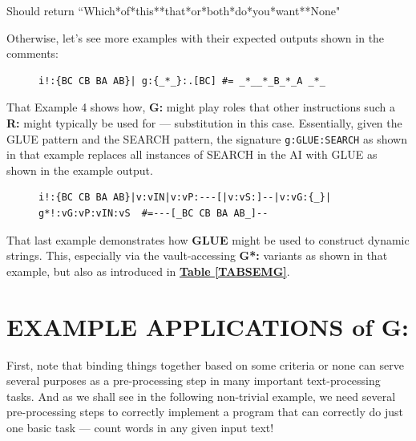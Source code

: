 \documentclass[a4paper, 18pt]{book} %
\begin{document}
Should return ``Which*of*this**that*or*both*do*you*want**None"


Otherwise, let's see more examples with their expected outputs shown in the comments:


\begin{figure}[H]
 \Large
  \centering
  \begin{tcolorbox}[teaterminalstyle, title=G: EXAMPLE 4]
  \begin{lstlisting}[language=TEA]
i!:{BC CB BA AB}| g:{_*_}:.[BC] #= _*__*_B_*_A _*_
   \end{lstlisting}
  \end{tcolorbox}
\end{figure}


That Example  4 shows how, \textbf{G:} might play roles that other instructions such a \textbf{R:} might typically be used for --- substitution in this case. Essentially, given the GLUE pattern and the SEARCH pattern, the signature \texttt{g:GLUE:SEARCH} as shown in that example replaces all instances of SEARCH in the AI with GLUE as shown in the example output.


\begin{figure}[H]
 \Large
  \centering
  \begin{tcolorbox}[teaterminalstyle, title=G: EXAMPLE 5]
  \begin{lstlisting}[language=TEA]
i!:{BC CB BA AB}|v:vIN|v:vP:---[|v:vS:]--|v:vG:{_}|
g*!:vG:vP:vIN:vS  #=---[_BC CB BA AB_]--
   \end{lstlisting}
  \end{tcolorbox}
\end{figure}

That last example demonstrates how \textbf{GLUE} might be used to construct dynamic strings. This, especially via the vault-accessing \textbf{G*:} variants as shown in that example, but also as introduced in \textbf{\hyperref[TABSEMG]{Table \ref{TABSEMG}}}.



\section{EXAMPLE APPLICATIONS of G:}
\label{SECEXAMPG}

  
First, note that binding things together based on some criteria or none can serve several purposes as a pre-processing step in many important text-processing tasks. And as we shall see in the following non-trivial example, we need several pre-processing steps to correctly implement a program that can correctly do just one basic task --- count words in any given input text!
\end{document}
